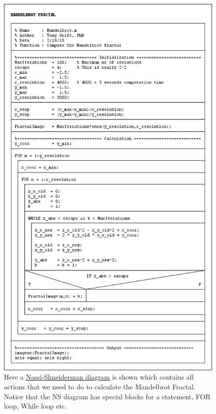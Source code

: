 \documentclass[12pt,letterpaper]{article}
\begin{document}
\begin{figure}
\centering
\includegraphics[width=0.75\linewidth]{MandelbrotNSDiagram}
\caption{Here a \href{http://en.wikipedia.org/wiki/Nassi-Shneiderman_diagram}{Nassi-Shneiderman diagram}  is shown which contains all actions that we need to do to calculate the Mandelbrot Fractal. Notice that the NS diagram has special blocks for a statement, FOR loop, While loop etc.}
\label{fig:MandelbrotNSDiagram}
\end{figure}
\end{document}
